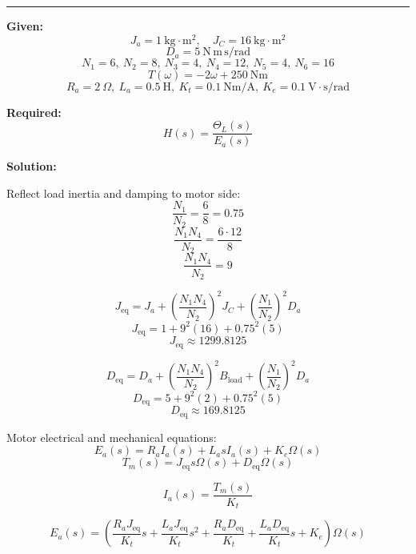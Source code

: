 \begin{figure}[h!]
\end{figure}


\noindent\rule{\textwidth}{1pt}
\textbf{Given:}
\[
J_a = 1\ \mathrm{kg\cdot m^2}, \quad J_C = 16\ \mathrm{kg\cdot m^2}
\]
\[
D_a = 5\ \mathrm{N\,m\,s/rad}
\]
\[
N_1 = 6, \ N_2 = 8, \ N_3 = 4, \ N_4 = 12, \ N_5 = 4, \ N_6 = 16
\]
\[
T(\omega) = -2 \omega + 250\ \mathrm{Nm}
\]
\[
R_a = 2\ \Omega, \ L_a = 0.5\ \mathrm{H}, \ K_t = 0.1\ \mathrm{Nm/A}, \ K_e = 0.1\ \mathrm{V\cdot s/rad}
\]

\textbf{Required:}
\[
H(s) = \frac{\Theta_L(s)}{E_a(s)}
\]

\textbf{Solution:}

Reflect load inertia and damping to motor side:
\[
\frac{N_1}{N_2} = \frac{6}{8} = 0.75
\]
\[
\frac{N_1 N_4}{N_2} = \frac{6 \cdot 12}{8} 
\]
\[
\frac{N_1 N_4}{N_2}= 9
\]

\[
J_\mathrm{eq} = J_a + \left(\frac{N_1 N_4}{N_2}\right)^2 J_C + \left(\frac{N_1}{N_2}\right)^2 D_a 
\]
\[
J_\mathrm{eq} = 1 + 9^2 (16) + 0.75^2 (5) 
\]
\[
J_\mathrm{eq} \approx 1299.8125
\]

\[
D_\mathrm{eq} = D_a + \left(\frac{N_1 N_4}{N_2}\right)^2 B_\mathrm{load} + \left(\frac{N_1}{N_2}\right)^2 D_a
\]
\[
D_\mathrm{eq}= 5 + 9^2 (2) + 0.75^2 (5) 
\]
\[
D_\mathrm{eq}\approx 169.8125
\]

Motor electrical and mechanical equations:
\[
E_a(s) = R_a I_a(s) + L_a s I_a(s) + K_e \Omega(s)
\]
\[
T_m(s) = J_\mathrm{eq} s \Omega(s) + D_\mathrm{eq} \Omega(s)
\]

\[
I_a(s) = \frac{T_m(s)}{K_t}
\]

\[
E_a(s) = \left(\frac{R_a J_\mathrm{eq}}{K_t} s + \frac{L_a J_\mathrm{eq}}{K_t} s^2 + \frac{R_a D_\mathrm{eq}}{K_t} + \frac{L_a D_\mathrm{eq}}{K_t} s + K_e \right) \Omega(s)
\]

